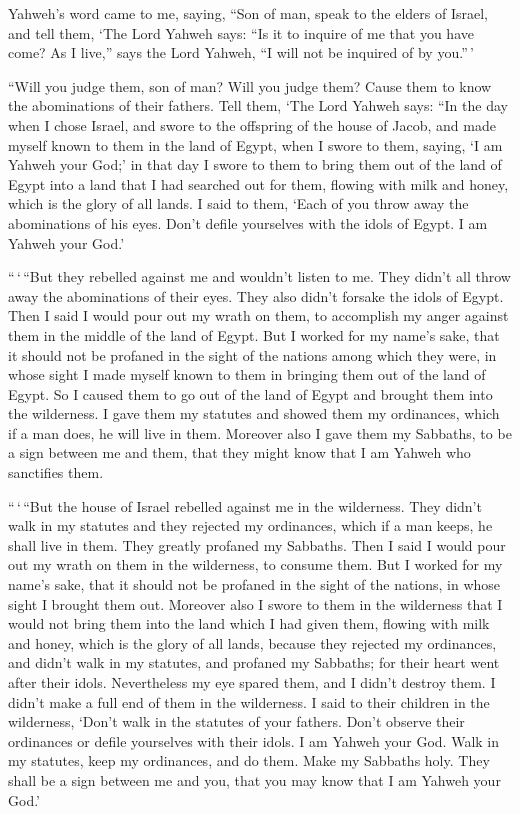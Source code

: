  Yahweh's word came to me, saying,  ``Son of
man, speak to the elders of Israel, and tell them, `The Lord Yahweh
says: ``Is it to inquire of me that you have come? As I live,'' says the
Lord Yahweh, ``I will not be inquired of by you.''\,'

 ``Will you judge them, son of man? Will you judge them?
Cause them to know the abominations of their fathers. 
Tell them, `The Lord Yahweh says: ``In the day when I chose Israel, and
swore to the offspring of the house of Jacob, and made myself known to
them in the land of Egypt, when I swore to them, saying, `I am Yahweh
your God;'  in that day I swore to them to bring them out
of the land of Egypt into a land that I had searched out for them,
flowing with milk and honey, which is the glory of all lands.
 I said to them, `Each of you throw away the abominations
of his eyes. Don't defile yourselves with the idols of Egypt. I am
Yahweh your God.'

 ``\,`\,``But they rebelled against me and wouldn't listen
to me. They didn't all throw away the abominations of their eyes. They
also didn't forsake the idols of Egypt. Then I said I would pour out my
wrath on them, to accomplish my anger against them in the middle of the
land of Egypt.  But I worked for my name's sake, that it
should not be profaned in the sight of the nations among which they
were, in whose sight I made myself known to them in bringing them out of
the land of Egypt.  So I caused them to go out of the
land of Egypt and brought them into the wilderness.  I
gave them my statutes and showed them my ordinances, which if a man
does, he will live in them.  Moreover also I gave them my
Sabbaths, to be a sign between me and them, that they might know that I
am Yahweh who sanctifies them.

 ``\,`\,``But the house of Israel rebelled against me in
the wilderness. They didn't walk in my statutes and they rejected my
ordinances, which if a man keeps, he shall live in them. They greatly
profaned my Sabbaths. Then I said I would pour out my wrath on them in
the wilderness, to consume them.  But I worked for my
name's sake, that it should not be profaned in the sight of the nations,
in whose sight I brought them out.  Moreover also I swore
to them in the wilderness that I would not bring them into the land
which I had given them, flowing with milk and honey, which is the glory
of all lands,  because they rejected my ordinances, and
didn't walk in my statutes, and profaned my Sabbaths; for their heart
went after their idols.  Nevertheless my eye spared them,
and I didn't destroy them. I didn't make a full end of them in the
wilderness.  I said to their children in the wilderness,
`Don't walk in the statutes of your fathers. Don't observe their
ordinances or defile yourselves with their idols.  I am
Yahweh your God. Walk in my statutes, keep my ordinances, and do them.
 Make my Sabbaths holy. They shall be a sign between me
and you, that you may know that I am Yahweh your God.'

